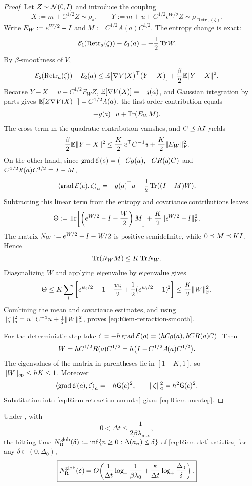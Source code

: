 \begin{proof}
Let $Z\sim\mathcal{N}(0,I)$ and introduce the coupling
\[
    X:=m+C^{1/2}Z\sim\rho_a,
    \qquad
    Y:=m+u+C^{1/2}e^{W/2}Z
    \sim\rho_{\operatorname{Retr}_a(\zeta)}.
\]
Write $E_W:=e^{W/2}-I$ and $M:=C^{1/2}A(a)C^{1/2}$.  The entropy change is exact:
\[
    \mathcal{E}_1(\operatorname{Retr}_a(\zeta))-\mathcal{E}_1(a)
    =-\frac12\operatorname{Tr} W.
\]
By $\beta$-smoothness of $V$,
\[
    \mathcal{E}_2(\operatorname{Retr}_a(\zeta))-\mathcal{E}_2(a)
    \leq
    \mathbb{E}\!\left[\nabla V(X)^\top(Y-X)\right]
    +\frac\beta2\mathbb{E}\|Y-X\|^2.
\]
Because $Y-X=u+C^{1/2}E_WZ$, $\mathbb{E}[\nabla V(X)]=-g(a)$, and Gaussian integration by
parts gives $\mathbb{E}[Z\nabla V(X)^\top]=C^{1/2}A(a)$, the first-order contribution equals
\[
    -g(a)^\top u+\operatorname{Tr}(E_WM).
\]
The cross term in the quadratic contribution vanishes, and $C\preceq\Lambda I$ yields
\[
    \frac\beta2\mathbb{E}\|Y-X\|^2
    \leq
    \frac K2\,u^\top C^{-1}u
    +\frac K2\|E_W\|_{\mathrm{F}}^2.
\]
On the other hand, since
$\operatorname{grad}\mathcal{E}(a)=(-Cg(a),-C R(a)C)$ and
$C^{1/2}R(a)C^{1/2}=I-M$,
\[
    \left\langle \operatorname{grad}\mathcal{E}(a),\zeta\right\rangle_a
    =-g(a)^\top u-\frac12\operatorname{Tr}((I-M)W).
\]
Subtracting this linear term from the entropy and covariance contributions leaves
\[
    \Theta
    :=\operatorname{Tr}\!\left[\left(e^{W/2}-I-\frac W2\right)M\right]
      +\frac K2\|e^{W/2}-I\|_{\mathrm{F}}^2.
\]
The matrix $N_W:=e^{W/2}-I-W/2$ is positive semidefinite, while
$0\preceq M\preceq KI$.  Hence
\[
    \operatorname{Tr}(N_WM)\leq K\operatorname{Tr} N_W.
\]
Diagonalizing $W$ and applying  eigenvalue by eigenvalue gives
\[
    \Theta
    \leq K\sum_i\left[
       e^{w_i/2}-1-\frac{w_i}{2}
       +\frac12(e^{w_i/2}-1)^2
    \right]
    \leq \frac K2\|W\|_{\mathrm{F}}^2.
\]
Combining the mean and covariance estimates, and using
$\|\zeta\|_a^2=u^\top C^{-1}u+\tfrac12\|W\|_{\mathrm{F}}^2$, proves
\eqref{eq:Riem-retraction-smooth}.

For the deterministic step take
$\zeta=-h\operatorname{grad}\mathcal{E}(a)=(hCg(a),hC R(a)C)$.  Then
\[
    W=hC^{1/2}R(a)C^{1/2}
      =h\bigl(I-C^{1/2}A(a)C^{1/2}\bigr).
\]
The eigenvalues of the matrix in parentheses lie in $[1-K,1]$, so
$\|W\|_{\mathrm{op}}\leq hK\leq1$.  Moreover
\[
    \left\langle \operatorname{grad}\mathcal{E}(a),\zeta\right\rangle_a=-h\mathsf{G}(a)^2,
    \qquad
    \|\zeta\|_a^2=h^2\mathsf{G}(a)^2.
\]
Substitution into \eqref{eq:Riem-retraction-smooth} gives
\eqref{eq:Riem-onestep}.
\end{proof}

\begin{theorem}
\label{thm:Riem-global}
Under , with
\[
    0<\Delta t\leq\frac1{2\beta\lambda_{\max}},
\]
the hitting time
$N_{\mathrm{R}}^{\mathrm{glob}}(\delta):=\inf\{n\geq0:\Delta(a_n)\leq\delta\}$ of \eqref{eq:Riem-det}
satisfies, for any $\delta\in(0,\Delta_0)$,
\[
    \boxed{
    N_{\mathrm{R}}^{\mathrm{glob}}(\delta)
    =
    O\!\left(
        \frac1{\Delta t}\log_+\frac1{\beta\lambda_0}
        +
        \frac\kappa{\Delta t}\log_+\frac{\Delta_0}{\delta}
    \right).
    }
\]
\end{theorem}

